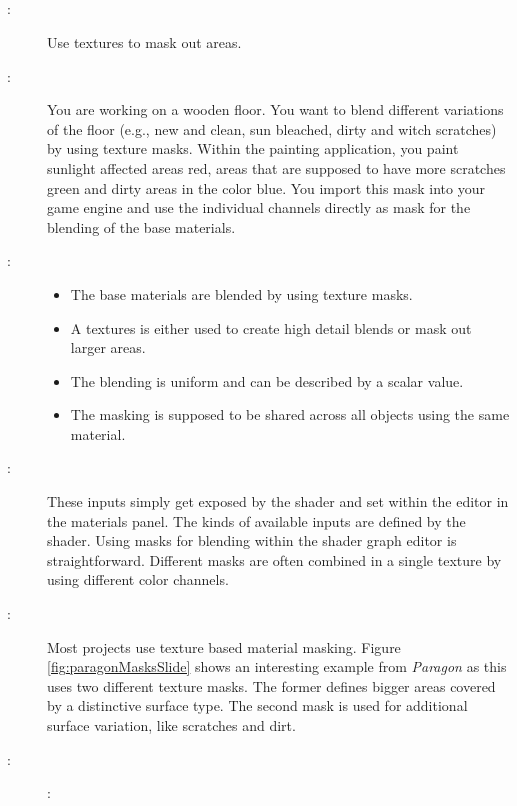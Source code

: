 \subsection{\patMaskingCreationInpt}\label{\patMaskingCreationInpt}
\begin{description}
	\item[\patIntent:]%
	Use textures to mask out areas. 
	\item[\patMotivation:]%
	You are working on a wooden floor. You want to blend different variations of the floor (e.g., new and clean, sun bleached, dirty and witch scratches) by using texture masks. Within the painting application, you paint sunlight affected areas red, areas that are supposed to have more scratches green and dirty areas in the color blue. You import this mask into your game engine and use the individual channels directly as mask for the blending of the base materials. 
	\item[\patApplicability:]\hfill
	\begin{itemize}\mynobreakpar
		\item The base materials are blended by using texture masks.
		\item A textures is either used to create high detail blends or mask out larger areas. 
		\item The blending is uniform and can be described by a scalar value. 
		\item The masking is supposed to be shared across all objects using the same material.
	\end{itemize}
	\item[\patImplementation:]%
	These inputs simply get exposed by the shader and set within the editor in the materials panel. The kinds of available inputs are defined by the shader. Using masks for blending within the shader graph editor is straightforward. Different masks are often combined in a single texture by using different color channels. 
	\item[\patExamples:]%
	Most projects use texture based material masking. Figure \ref{fig:paragonMasksSlide} shows an interesting example from \emph{Paragon} as this uses two different texture masks. The former defines bigger areas covered by a distinctive surface type. The second mask is used for additional surface variation, like scratches and dirt. 
	\item[\patConsequences:]\hfill 
		\begin{description}
			\item[\visual:]\hfill

\end{description}
\end{description}
